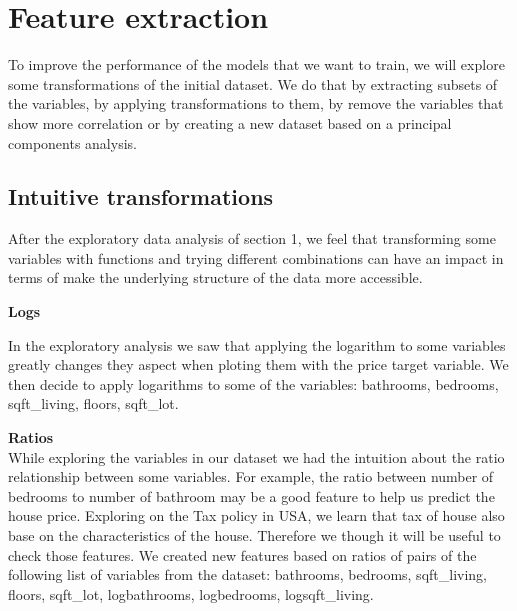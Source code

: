 \section{Feature extraction}

To improve the performance of the models that we want to train, we will explore some transformations of the initial dataset. We do that by extracting subsets of the variables, by applying transformations to them, by remove the variables that show more correlation or by creating a new dataset based on a principal components analysis.

\subsection{Intuitive transformations}

After the exploratory data analysis of section 1, we feel that transforming some variables with functions and trying different combinations can have an impact in terms of make the underlying structure of the data more accessible.

\textbf{Logs}

In the exploratory analysis we saw that applying the logarithm to some variables greatly changes they aspect when ploting them with the price target variable. We then decide to apply logarithms to some of the variables: bathrooms, bedrooms, sqft\_living, floors, sqft\_lot.



\textbf{Ratios}\\
While exploring the variables in our dataset we had the intuition about the ratio relationship between some variables. For example, the ratio between number of bedrooms to number of bathroom may be a good feature to help us predict the house price. Exploring on the Tax policy in USA\cite{tax}, we learn that tax of house also base on the characteristics of the house. Therefore we though it will be useful to check those features. We created new features based on ratios of pairs of the following list of variables from the dataset: bathrooms, bedrooms, sqft\_living, floors, sqft\_lot, logbathrooms, logbedrooms, logsqft\_living.





